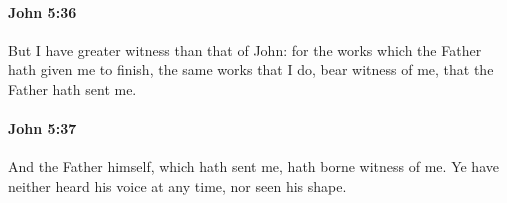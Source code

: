 		\paragraph{John 5:36} %
			\label{JOHN-5-36}

			But I have greater witness than that of John: for the works which the Father hath given me to finish, the same works that I do, bear witness of me, that the Father hath sent me.

			\begin{framed}
			\scriptsize
				\begin{compactdesc}
					\item[SBLG]  \hyperref[TELEIOO]{} 
				\end{compactdesc}
			\end{framed}

		\paragraph{John 5:37} %
			\label{JOHN-5-37}

			And the Father himself, which hath sent me, hath borne witness of me. Ye have neither heard his voice at any time, nor seen his shape.

